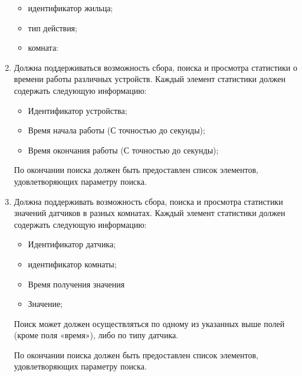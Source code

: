 \begin{enumerate}
            \begin{itemize}
              \item идентификатор жильца;
	            \item тип действия;
	            \item комната: 
            \end{itemize}
        \item Должна поддерживаться возможность сбора, поиска и просмотра статистики о времени работы различных устройств. Каждый элемент статистики должен содержать следующую информацию:
          \begin{itemize}
            \item Идентификатор устройства;
            \item Время начала работы (С точностью до секунды);
            \item Время окончания работы (С точностью до секунды);
          \end{itemize}          
          По окончании поиска должен быть предоставлен список элементов, удовлетворяющих параметру поиска.
        \item Должна поддерживать возможность сбора, поиска и просмотра статистики значений датчиков в разных комнатах. Каждый элемент статистики должен содержать следующую информацию:
          \begin{itemize}
            \item Идентификатор датчика;
	          \item идентификатор комнаты;
	          \item Время получения значения
	          \item Значение;
          \end{itemize}
          Поиск может должен осуществляться по одному из указанных выше полей (кроме поля «время»), либо по типу датчика.
          
          По окончании поиска должен быть предоставлен список элементов, удовлетворяющих параметру поиска. 
      \end{enumerate}
